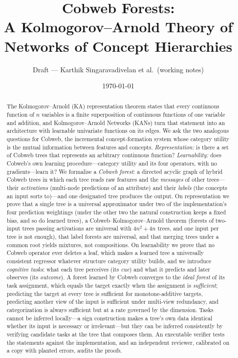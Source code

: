 \documentclass[11pt]{article}
\title{Cobweb Forests:\\ A Kolmogorov--Arnold Theory of Networks of Concept Hierarchies}
\author{Draft --- Karthik Singaravadivelan et al.\ (working notes)}
\date{\today}
\theoremstyle{definition}
\theoremstyle{remark}
\begin{document}
\maketitle

\begin{abstract}
The Kolmogorov--Arnold (KA) representation theorem states that every continuous
function of $n$ variables is a finite superposition of continuous functions of one
variable and addition, and Kolmogorov--Arnold Networks (KANs) turn that statement into
an architecture with learnable univariate functions on its edges.  We ask the two
analogous questions for Cobweb, the incremental concept-formation system whose
category utility is the mutual information between features and concepts.
\emph{Representation:} is there a set of Cobweb trees that represents an arbitrary
continuous function?  \emph{Learnability:} does Cobweb's own learning
procedure---category utility and its four operators, with no gradients---learn it?
We formalise a \emph{Cobweb forest}: a directed acyclic graph of hybrid Cobweb trees in
which each tree reads raw features and the \emph{messages} of other trees---their
\emph{activations} (multi-node predictions of an attribute) and their \emph{labels}
(the concepts an input sorts to)---and one designated tree produces the output.
On representation we prove that a single tree is a universal approximator under two of
the implementation's four prediction weightings (under the other two the natural
construction keeps a fixed bias, and so do learned trees), a
Cobweb--Kolmogorov--Arnold theorem (forests of two-input trees passing activations are
universal with $4n^2+4n$ trees, and one input per tree is not enough), that label forests
are universal, and that merging trees under a common root yields mixtures, not
compositions.  On learnability we prove that no Cobweb operator ever deletes a leaf,
which makes a learned tree a universally consistent regressor whatever structure
category utility builds, and we introduce \emph{cognitive tasks}: what each tree
perceives (its \emph{cue}) and what it predicts and later observes (its
\emph{outcome}).  A forest learned by Cobweb converges to the \emph{ideal forest} of its
task assignment, which equals the target exactly when the assignment is
\emph{sufficient}; predicting the target at every tree is sufficient for
monotone-additive targets, predicting another view of the input is sufficient under
multi-view redundancy, and categorization is always sufficient but at a rate governed by
the dimension.  Tasks cannot be inferred locally---a sign construction makes a tree's
own data identical whether its input is necessary or irrelevant---but they can be
inferred consistently by verifying candidate tasks at the tree that composes them.  An
executable verifier tests the statements against the implementation, and an independent
reviewer, calibrated on a copy with planted errors, audits the proofs.
\end{abstract}
\end{document}
